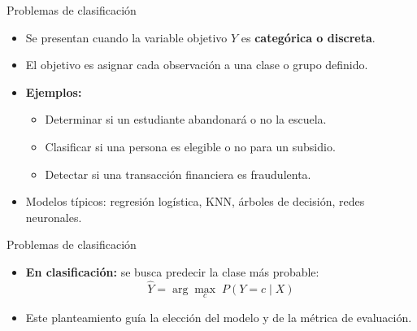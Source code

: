 \documentclass{beamer}
\begin{document}
\begin{frame}{Problemas de clasificación}
	\begin{itemize}
		\item Se presentan cuando la variable objetivo $Y$ es \textbf{categórica o discreta}.
		\item El objetivo es asignar cada observación a una clase o grupo definido.
		\item \textbf{Ejemplos:}
		\begin{itemize}
			\item Determinar si un estudiante abandonará o no la escuela.
			\item Clasificar si una persona es elegible o no para un subsidio.
			\item Detectar si una transacción financiera es fraudulenta.
		\end{itemize}
		\item Modelos típicos: regresión logística, KNN, árboles de decisión, redes neuronales.
	\end{itemize}
	\end{frame}
	
\begin{frame}{Problemas de clasificación}
		\begin{itemize}

   		 \item \textbf{En clasificación:} se busca predecir la clase más probable:
		\[
		\hat{Y} = \arg\max_{c} \; P(Y = c \mid X)
		\]

\item Este planteamiento guía la elección del modelo y de la métrica de evaluación.
\end{itemize}
\end{frame}
\end{document}
